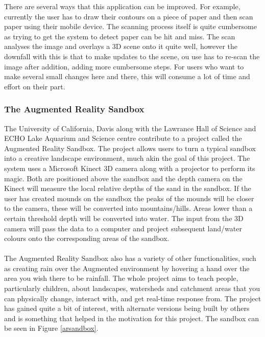 \documentclass[11pt]{article}
\begin{document}
There are several ways that this application can be improved. For example,
currently the user has to draw their contours on a piece of paper and then
scan paper using their mobile device. The scanning process itself is quite 
cumbersome as trying to get the system to detect paper can be hit and miss.
The scan analyses the image and overlays a 3D scene onto it quite well, however
the downfall with this is that to make updates to the scene, ou use has to
re-scan the image after addition, adding more cumbersome steps. For users
who want to make several small changes here and there, this will consume a lot
of time and effort on their part.

\subsubsection{The Augmented Reality Sandbox}
The University of California, Davis along with the Lawrance Hall of Science 
and ECHO Lake Aquarium and Science centre contribute to a project called the
Augmented Reality Sandbox\cite{Reed14}. The project allows users to turn a 
typical sandbox
into a creative landscape environment, much akin the goal of this project.
The system uses a Microsoft Kinect 3D camera along with a projector to 
perform its magic. Both are positioned above the sandbox and the depth 
camera on the Kinect
will measure the local relative depths of the sand in the sandbox. If the
user has created mounds on the sandbox the peaks of the mounds
will be closer to the camera, these will be converted into mountains/hills. 
Areas lower than a certain threshold 
depth will be converted into water. The input from the 3D camera will pass 
the data to a computer and project subsequent land/water colours onto the
corresponding areas of the sandbox.\\
\\
The Augmented Reality Sandbox also has a variety of other functionalities, such
as creating rain over the Augmented environment by hovering a hand over the 
area you wish there to be rainfall. The whole project aims to teach people, 
particularly children, about landscapes, watersheds and catchment areas 
that you can physically change, interact with, and get real-time response 
from. The project has gained quite a bit of interest, with alternate 
versions being built by others and is something that helped in the 
motivation for this project. The sandbox can be seen in Figure \ref{arsandbox}. \\
\end{document}
